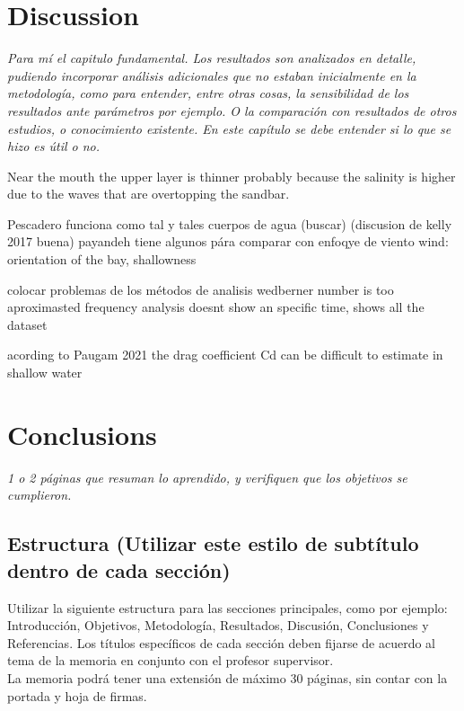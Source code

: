 \documentclass[11pt,letterpaper]{article}
\begin{document}
\section{Discussion}

\textit{Para mí el capitulo fundamental. Los resultados son analizados en detalle, pudiendo incorporar análisis adicionales que no estaban inicialmente en la metodología, como para entender, entre otras cosas, la sensibilidad de los resultados ante parámetros por ejemplo. O la comparación con resultados de otros estudios, o conocimiento existente. En este capítulo se debe entender si lo que se hizo es útil o no.}

Near the mouth the upper layer is thinner probably because the salinity is higher due to the waves that are overtopping the sandbar.

Pescadero funciona como tal y tales cuerpos de agua (buscar) (discusion de kelly 2017 buena)
payandeh tiene algunos pára comparar con enfoqye de viento
wind: orientation of the bay, shallowness

colocar problemas de los métodos de analisis
wedberner number is too aproximasted
frequency analysis doesnt show an specific time, shows all the dataset

acording to Paugam 2021 the drag coefficient Cd can be difficult to estimate in shallow water %

\section{Conclusions}

\textit{1 o 2 páginas que resuman lo aprendido, y verifiquen que los objetivos se cumplieron.}

\subsection{Estructura (Utilizar este estilo de subtítulo dentro de cada sección)}
Utilizar la siguiente estructura para las secciones principales, como por ejemplo: Introducción, Objetivos, Metodología, Resultados, Discusión, Conclusiones y Referencias. Los títulos específicos de cada sección deben fijarse de acuerdo al tema de la memoria en conjunto con el profesor supervisor.\\

La memoria podrá tener una extensión de máximo 30 páginas, sin contar con la portada y hoja de firmas.


\printbibliography
\end{document}
